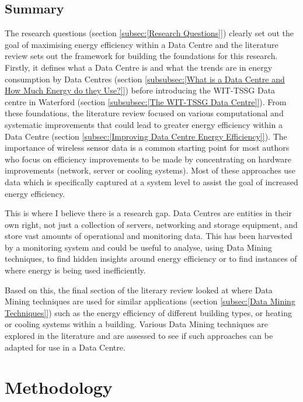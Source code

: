 \documentclass[12pt]{scrartcl}
\begin{document}
\subsection{Summary}  
\label{subsec:[Summary]}
The research questions (section \ref{subsec:[Research Questions]}) clearly set out the goal of maximising energy efficiency within a Data Centre and the literature review sets out the framework for building the foundations for this research. Firstly, it defines what a Data Centre is and what the trends are in energy consumption by Data Centres (section \ref{subsubsec:[What is a Data Centre and How Much Energy do they Use?]}) before introducing the WIT-TSSG Data centre in Waterford (section \ref{subsubsec:[The WIT-TSSG Data Centre]}). From these foundations, the literature review focused on various computational and systematic improvements that could lead to greater energy efficiency within a Data Centre (section \ref{subsec:[Improving Data Centre Energy Efficiency]}). The importance of wireless sensor data is a common starting point for most authors who focus on efficiency improvements to be made by concentrating on hardware improvements (network, server or cooling systems). Most of these approaches use data which is specifically captured at a system level to assist the goal of increased energy efficiency.

This is where I believe there is a research gap. Data Centres are entities in their own right, not just a collection of servers, networking and storage equipment, and store vast amounts of operational and monitoring data. This has been harvested by a monitoring system and could be useful to analyse, using Data Mining techniques, to find hidden insights around energy efficiency or to find instances of where energy is being used inefficiently. 

Based on this, the final section of the literary review looked at where Data Mining techniques are used for similar applications (section \ref{subsec:[Data Mining Techniques]}) such as the energy efficiency of different building types, or heating or cooling systems within a building. Various Data Mining techniques are explored in the literature and are assessed to see if such approaches can be adapted for use in a Data Centre.   

\section{Methodology}

\label{sec:[Methodology]}
\end{document}
